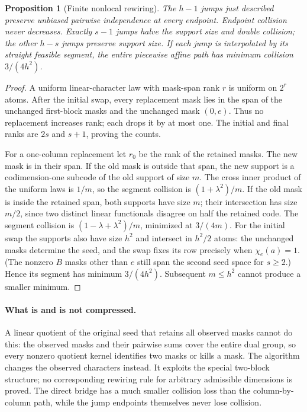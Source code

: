 \documentclass[11pt]{article}
\newtheorem{proposition}[theorem]{Proposition}
\begin{document}
\begin{proposition}[Finite nonlocal rewiring]\label{prop:compression-jumps}
The $h-1$ jumps just described preserve unbiased pairwise independence
at every endpoint. Endpoint collision never decreases. Exactly $s-1$
jumps halve the support size and double collision; the other $h-s$
jumps preserve support size. If each jump is interpolated by its straight
feasible segment, the entire piecewise affine path has minimum collision
$3/(4h^2)$.
\end{proposition}
\begin{proof}
A uniform linear-character law with mask-span rank $r$ is uniform on
$2^r$ atoms. After the initial swap, every replacement mask lies in the
span of the unchanged first-block masks and the unchanged mask $(0,e)$.
Thus no replacement increases rank; each drops it by at most one.
The initial and final ranks are $2s$ and $s+1$, proving the counts.

For a one-column replacement let $r_0$ be the rank of the retained masks.
The new mask is in their span. If the old mask is outside that span, the
new support is a codimension-one subcode of the old support of size $m$.
The cross inner product of the uniform laws is $1/m$, so the segment
collision is $(1+\lambda^2)/m$. If the old mask is inside the retained
span, both supports have size $m$; their intersection has size $m/2$,
since two distinct linear functionals disagree on half the retained
code. The segment collision is
$(1-\lambda+\lambda^2)/m$, minimized at $3/(4m)$.
For the initial swap the supports also have size $h^2$ and intersect in
$h^2/2$ atoms: the unchanged masks determine the seed, and the swap
fixes its row precisely when $\chi_e(a)=1$. (The nonzero $B$ masks
other than $e$ still span the second seed space for $s\ge2$.) Hence
its segment has minimum $3/(4h^2)$. Subsequent $m\le h^2$ cannot
produce a smaller minimum.
\end{proof}

\paragraph{What is and is not compressed.}
A linear quotient of the original seed that retains all observed masks
cannot do this: the observed masks and their pairwise sums cover the
entire dual group, so every nonzero quotient kernel identifies two masks
or kills a mask. The algorithm changes the observed characters instead.
It exploits the special two-block structure; no corresponding rewiring
rule for arbitrary admissible dimensions is proved. The direct bridge
has a much smaller collision loss than the column-by-column path, while
the jump endpoints themselves never lose collision.
\end{document}
